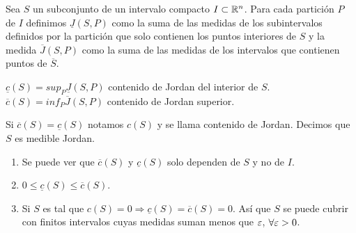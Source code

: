 \begin{definition}
  Sea $S$ un subconjunto de un intervalo compacto $I \subset \mathbb{R}^n$. Para cada partición $P$ de $I$ definimos $\underline{J}(S, P)$ como la suma de las medidas de los subintervalos definidos por la partición que solo contienen los puntos interiores de $S$ y la medida $\overline{J}(S, P)$ como la suma de las medidas de los intervalos que contienen puntos de $\overline{S}$.
\end{definition}

\begin{definition}
  $\underline{c}(S) = sup_P \underline{J}(S, P)$ contenido de Jordan del interior de $S$.
  $\overline{c}(S) = inf_P \overline{J}(S, P)$ contenido de Jordan superior.
\end{definition}

\begin{definition}
  Si $\overline{c}(S) = \underline{c}(S)$ notamos $c(S)$ y se llama contenido de Jordan. Decimos que $S$ es medible Jordan.
\end{definition}

\begin{note}
  \begin{enumerate}
    \item Se puede ver que $\overline{c}(S)$ y $\underline{c}(S)$ solo dependen de $S$ y no de $I$.
    \item $0 \leq \underline{c}(S) \leq \overline{c}(S)$.
    \item Si $S$ es tal que $c(S) = 0 \Rightarrow \underline{c}(S) = \overline{c}(S) = 0$. Así que $S$ se puede cubrir con finitos intervalos cuyas medidas suman menos que $\varepsilon$, $\forall \varepsilon > 0$. 
  \end{enumerate}
\end{note}
